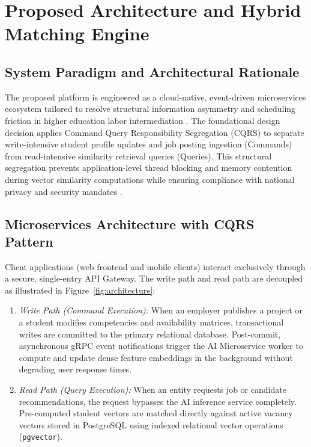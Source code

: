 \documentclass[a4paper,fleqn]{cas-dc}
\begin{document}
\section{Proposed Architecture and Hybrid Matching Engine}
\label{sec:architecture}

\subsection{System Paradigm and Architectural Rationale}
The proposed platform is engineered as a cloud-native, event-driven microservices ecosystem tailored to resolve structural information asymmetry and scheduling friction in higher education labor intermediation \cite{valencia2023, yang2024}. The foundational design decision applies Command Query Responsibility Segregation (CQRS) \cite{mohottige2025} to separate write-intensive student profile updates and job posting ingestion (Commands) from read-intensive similarity retrieval queries (Queries). This structural segregation prevents application-level thread blocking and memory contention during vector similarity computations while ensuring compliance with national privacy and security mandates \cite{ley29733, dl1270}.

\subsection{Microservices Architecture with CQRS Pattern}
Client applications (web frontend and mobile clients) interact exclusively through a secure, single-entry API Gateway. The write path and read path are decoupled as illustrated in Figure~\ref{fig:architecture}:
\begin{enumerate}
    \item \textit{Write Path (Command Execution):} When an employer publishes a project or a student modifies competencies and availability matrices, transactional writes are committed to the primary relational database. Post-commit, asynchronous gRPC event notifications trigger the AI Microservice worker to compute and update dense feature embeddings in the background without degrading user response times.
    \item \textit{Read Path (Query Execution):} When an entity requests job or candidate recommendations, the request bypasses the AI inference service completely. Pre-computed student vectors are matched directly against active vacancy vectors stored in PostgreSQL using indexed relational vector operations (\texttt{pgvector}).
\end{enumerate}
\end{document}
